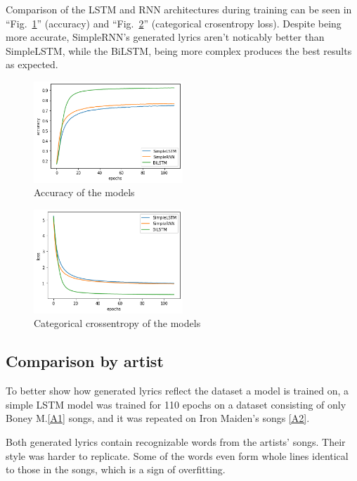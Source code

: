 \documentclass[conference]{IEEEtran}
\begin{document}
Comparison of the LSTM and RNN architectures during training can be seen in
``Fig.~\ref{fig}'' (accuracy) and ``Fig.~\ref{fig2}'' (categorical crosentropy 
loss). Despite being more accurate, SimpleRNN's generated lyrics aren't
noticably better than SimpleLSTM, while the BiLSTM, being more complex
produces the best results as expected. 


\begin{figure}[htbp]
\centerline{\includegraphics[width=0.5\textwidth]{epochs.png}}
\caption{Accuracy of the models}
\label{fig}
\end{figure}

\begin{figure}[htbp]
\centerline{\includegraphics[width=0.5\textwidth]{loss.png}}
\caption{Categorical crossentropy of the models}
\label{fig2}
\end{figure}

\subsection{Comparison by artist}
To better show how generated lyrics reflect the dataset a model is trained on,
a simple LSTM model was trained for 110 epochs on a dataset consisting of only
Boney M.\ref{A1} songs, and it was repeated on Iron Maiden's songs \ref{A2}.

Both generated lyrics contain recognizable words from the artists' songs. Their
style was harder to replicate. Some of the words even form whole lines identical
to those in the songs, which is a sign of overfitting. 
\end{document}
